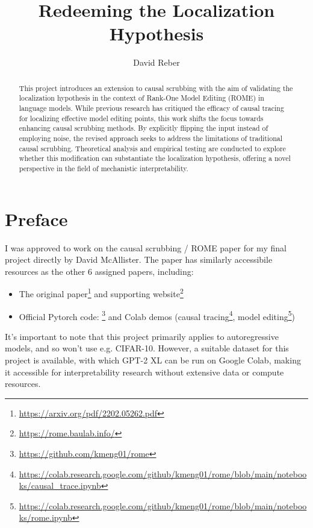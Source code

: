 \documentclass{article}
\title{Redeeming the Localization Hypothesis}
\date{}
\author{David Reber}
\affil{Computer Science Department, University of Chicago}
\begin{document}
\maketitle

\begin{abstract}
  This project introduces an extension to causal scrubbing with the aim of validating the localization hypothesis in the context of Rank-One Model Editing (ROME) in language models. While previous research has critiqued the efficacy of causal tracing for localizing effective model editing points, this work shifts the focus towards enhancing causal scrubbing methods. By explicitly flipping the input instead of employing noise, the revised approach seeks to address the limitations of traditional causal scrubbing. Theoretical analysis and empirical testing are conducted to explore whether this modification can substantiate the localization hypothesis, offering a novel perspective in the field of mechanistic interpretability.
\end{abstract}

\section{Preface}
I was approved to work on the causal scrubbing / ROME paper \cite{meng2022locating} for my final project directly by David McAllister. The paper has similarly accessibile resources as the other 6 assigned papers, including:

\begin{itemize}
    \item The original paper\footnote{\url{https://arxiv.org/pdf/2202.05262.pdf}} and supporting website\footnote{\url{https://rome.baulab.info/}}
    \item Official Pytorch code: \footnote{\url{https://github.com/kmeng01/rome}} and Colab demos (causal tracing\footnote{\url{https://colab.research.google.com/github/kmeng01/rome/blob/main/notebooks/causal_trace.ipynb}}, model editing\footnote{\url{https://colab.research.google.com/github/kmeng01/rome/blob/main/notebooks/rome.ipynb}})
\end{itemize}

It's important to note that this project primarily applies to autoregressive models, and so won't use e.g. CIFAR-10. However, a suitable dataset for this project is available, with which GPT-2 XL can be run on Google Colab, making it accessible for interpretability research without extensive data or compute resources.
\end{document}

